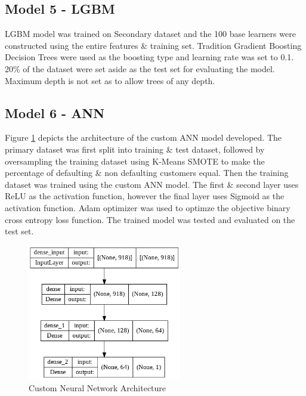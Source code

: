 \documentclass[twoside,11pt,a4paper]{article}
\begin{document}
\subsection{Model 5 - \acf{LGBM}}
\acs{LGBM} model was trained on Secondary dataset and the 100 base learners were constructed using the entire features \& training set. Tradition Gradient Boosting Decision Trees were used as the boosting type and learning rate was set to 0.1. 20\% of the dataset were set aside as the test set for evaluating the model. Maximum depth is not set as to allow trees of any depth. 

\subsection{Model 6 - \acf{ANN}}
Figure \ref{fig:nn_arch} depicts the architecture of the custom \acs{ANN} model developed.  The primary dataset was first split into training \& test dataset, followed by oversampling the training dataset using K-Means \acs{SMOTE} to make the percentage of defaulting \& non defaulting customers equal. Then the training dataset was trained using the custom \acs{ANN} model. The first \& second layer uses \acf{ReLU} as the activation function, however the final layer uses Sigmoid as the activation function. Adam optimizer was used to optimze the objective binary cross entropy loss function. The trained model was tested and evaluated on the test set.\\
\begin{figure}[ht]
	\centering
	\includegraphics[width=0.6\textwidth, height=0.3\textheight]{nn_arch}
	\caption[Custom Neural Network Architecture]{Custom Neural Network Architecture}
	\label{fig:nn_arch}
\end{figure}
\end{document}
